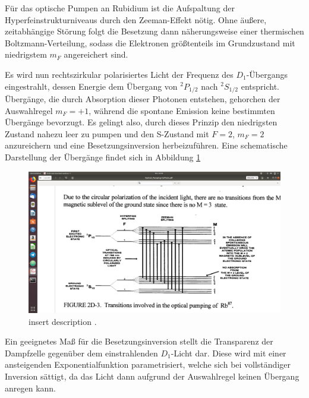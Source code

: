  Für das optische Pumpen an Rubidium ist die Aufspaltung der Hyperfeinstrukturniveaus durch den Zeeman-Effekt nötig. Ohne äußere, zeitabhängige Störung folgt die Besetzung dann näherungsweise einer thermischen Boltzmann-Verteilung, sodass die Elektronen größtenteils im Grundzustand mit niedrigstem $m_F$ angereichert sind.

  Es wird nun rechtszirkular polarisiertes Licht der Frequenz des $D_1$-Übergangs eingestrahlt, dessen Energie dem Übergang von ${}^{2}P_{1/2}$ nach ${}^{2}S_{1/2}$ entspricht. Übergänge, die durch Absorption dieser Photonen entstehen, gehorchen der Auswahlregel $m_F=+1$, während die spontane Emission keine bestimmten Übergänge bevorzugt. Es gelingt also, durch dieses Prinzip den niedrigsten Zustand nahezu leer zu pumpen und den S-Zustand mit $F=2$, $m_F=2$ anzureichern und eine Besetzungsinversion herbeizuführen. Eine schematische Darstellung der Übergänge findet sich in Abbildung \ref{fig:pumpschema}

  \begin{figure}
    \centering
    \includegraphics[width=\textwidth]{pictures/pumpschema.png}
    \caption{insert description \cite{stehendeWelle}.}
    \label{fig:pumpschema}
  \end{figure}

  Ein geeignetes Maß für die Besetzungsinversion stellt die Transparenz der Dampfzelle gegenüber dem einstrahlenden $D_1$-Licht dar. Diese wird mit einer ansteigenden Exponentialfunktion parametrisiert, welche sich bei vollständiger Inversion sättigt, da das Licht dann aufgrund der Auswahlregel keinen Übergang anregen kann.

  \cite{insert Bild?}

  \cite{FRAGE: EINFACH IMMER GROßBUCHSTABEN FÜR DIE QUANTENZAHLEN, SO WIE IN DER ALTEN ANLEITUNG?}

